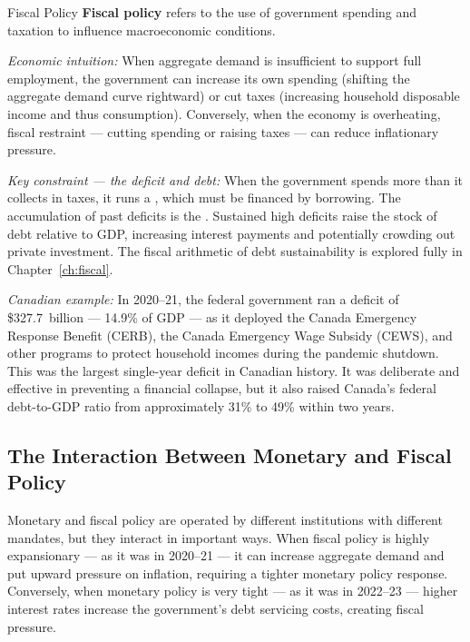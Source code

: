 \begin{defbox}{Fiscal Policy}
\textbf{Fiscal policy} refers to the use of government spending and
taxation to influence macroeconomic conditions.

\textit{Economic intuition:} When aggregate demand is insufficient to
support full employment, the government can increase its own spending
(shifting the aggregate demand curve rightward) or cut taxes (increasing
household disposable income and thus consumption). Conversely, when
the economy is overheating, fiscal restraint --- cutting spending or
raising taxes --- can reduce inflationary pressure.

\textit{Key constraint --- the deficit and debt:} When the government
spends more than it collects in taxes, it runs a ,
which must be financed by borrowing. The accumulation of past deficits
is the . Sustained high deficits raise the stock
of debt relative to GDP, increasing interest payments and potentially
crowding out private investment. The fiscal arithmetic of debt
sustainability is explored fully in Chapter~\ref{ch:fiscal}.

\textit{Canadian example:} In 2020--21, the federal government ran a
deficit of \$327.7~billion --- 14.9\% of GDP --- as it deployed the
Canada Emergency Response Benefit (CERB), the Canada Emergency Wage
Subsidy (CEWS), and other programs to protect household incomes during
the pandemic shutdown. This was the largest single-year deficit in
Canadian history. It was deliberate and effective in preventing a
financial collapse, but it also raised Canada's federal debt-to-GDP
ratio from approximately 31\% to 49\% within two years.
\end{defbox}

\subsection{The Interaction Between Monetary and Fiscal Policy}

Monetary and fiscal policy are operated by different institutions with
different mandates, but they interact in important ways. When fiscal
policy is highly expansionary --- as it was in 2020--21 --- it can
increase aggregate demand and put upward pressure on inflation, requiring
a tighter monetary policy response. Conversely, when monetary policy is
very tight --- as it was in 2022--23 --- higher interest rates increase
the government's debt servicing costs, creating fiscal pressure.

